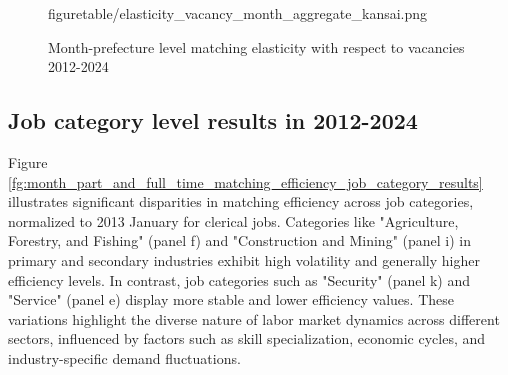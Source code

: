 \documentclass[12pt]{article}
\begin{document}
\begin{figure}[!ht]
\begin{center}
{  {figuretable/elasticity_vacancy_month_aggregate_kansai.png}}
  \\
  \caption{Month-prefecture level matching elasticity with respect to vacancies 2012-2024}
  \label{fg:month_part_and_full_time_elasticity_vacancy_month_aggregate_prefecture_results} 
  \end{center}
  \footnotesize
\end{figure} 

\subsection{Job category level results in 2012-2024}

Figure \ref{fg:month_part_and_full_time_matching_efficiency_job_category_results} illustrates significant disparities in matching efficiency across job categories, normalized to 2013 January for clerical jobs. Categories like "Agriculture, Forestry, and Fishing" (panel f) and "Construction and Mining" (panel i) in primary and secondary industries exhibit high volatility and generally higher efficiency levels. In contrast, job categories such as "Security" (panel k) and "Service" (panel e) display more stable and lower efficiency values. These variations highlight the diverse nature of labor market dynamics across different sectors, influenced by factors such as skill specialization, economic cycles, and industry-specific demand fluctuations.
\end{document}
